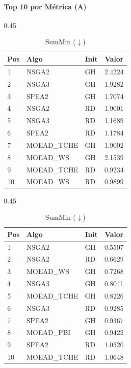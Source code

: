 \documentclass[a4paper,10pt]{article} %
\begin{document}
\paragraph{Top 10 por Métrica (A)}

\begin{table}[H]
    \centering
    \begin{subtable}[t]{0.45\textwidth}
        \centering
        \caption{Range ($\uparrow$)}
        \begin{tabular}{lllc}
            \toprule
            Pos & Algo & Init & Valor \\
            \midrule
            1 & NSGA2 & GH & 2.4224 \\
            2 & NSGA3 & GH & 1.9282 \\
            3 & SPEA2 & GH & 1.7074 \\
            4 & NSGA2 & RD & 1.9001 \\
            5 & NSGA3 & RD & 1.1689 \\
            6 & SPEA2 & RD & 1.1784 \\
            7 & MOEAD\_TCHE & GH & 1.9002 \\
            8 & MOEAD\_WS & GH & 2.1539 \\
            9 & MOEAD\_TCHE & RD & 0.9234 \\
            10 & MOEAD\_WS & RD & 0.9899 \\
            \bottomrule
        \end{tabular}
    \end{subtable}
    \hfill
    \begin{subtable}[t]{0.45\textwidth}
        \centering
        \caption{SumMin ($\downarrow$)}
        \begin{tabular}{lllc}
            \toprule
            Pos & Algo & Init & Valor \\
            \midrule
            1 & NSGA2 & GH & 0.5507 \\
            2 & NSGA2 & RD & 0.6629 \\
            3 & MOEAD\_WS & GH & 0.7268 \\
            4 & NSGA3 & GH & 0.8041 \\
            5 & MOEAD\_TCHE & GH & 0.8226 \\
            6 & NSGA3 & RD & 0.9285 \\
            7 & SPEA2 & GH & 0.9367 \\
            8 & MOEAD\_PBI & GH & 0.9422 \\
            9 & SPEA2 & RD & 1.0520 \\
            10 & MOEAD\_TCHE & RD & 1.0648 \\
            \bottomrule
        \end{tabular}
    \end{subtable}
\end{table}
\end{document}
